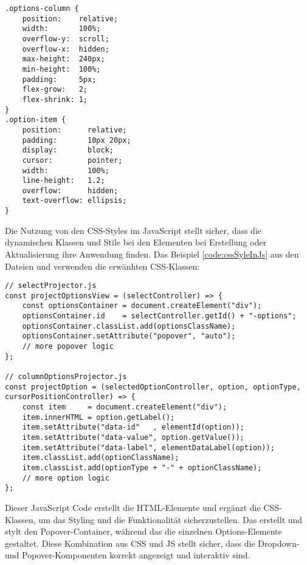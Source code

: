 \begin{lstlisting}[style = htmlcssjs, caption = Optionen und Scrollbar-Styling, label = code:optionStyling]
.options-column {
    position:    relative;
    width:       100%;
    overflow-y:  scroll;
    overflow-x:  hidden;
    max-height:  240px;
    min-height:  100%;
    padding:     5px;
    flex-grow:   2;
    flex-shrink: 1;
}
.option-item {
    position:      relative;
    padding:       10px 20px;
    display:       block;
    cursor:        pointer;
    width:         100%;
    line-height:   1.2;
    overflow:      hidden;
    text-overflow: ellipsis;
} 
\end{lstlisting}

Die Nutzung von den CSS-Styles im JavaScript stellt sicher, dass die dynamischen Klassen und Stile bei den Elementen bei Erstellung oder Aktualisierung ihre Anwendung finden. 
Das Beispiel \ref{code:cssSyleInJs} aus den Dateien  und  verwenden die erwänhten CSS-Klassen:

\begin{lstlisting}[style = htmlcssjs, caption = CSS-Styles im JavaScript, label = code:cssSyleInJs]
// selectProjector.js
const projectOptionsView = (selectController) => {
    const optionsContainer = document.createElement("div");
    optionsContainer.id    = selectController.getId() + "-options";
    optionsContainer.classList.add(optionsClassName);
    optionsContainer.setAttribute("popover", "auto");
    // more popover logic
};

// columnOptionsProjector.js
const projectOption = (selectedOptionController, option, optionType, cursorPositionController) => {
    const item     = document.createElement("div");
    item.innerHTML = option.getLabel();
    item.setAttribute("data-id"   , elementId(option));
    item.setAttribute("data-value", option.getValue());
    item.setAttribute("data-label", elementDataLabel(option));
    item.classList.add(optionClassName);
    item.classList.add(optionType + "-" + optionClassName);
    // more option logic
}; 
\end{lstlisting}

Dieser JavaScript Code erstellt die HTML-Elemente und ergänzt die CSS-Klassen, um das Styling und die Funktionalität sicherzustellen. 
Das  erstellt und stylt den Popover-Container, während das  die einzelnen Options-Elemente gestaltet. 
Diese Kombination aus CSS und JS stellt sicher, dass die Dropdown- und Popover-Komponenten korrekt angezeigt und interaktiv sind. 


